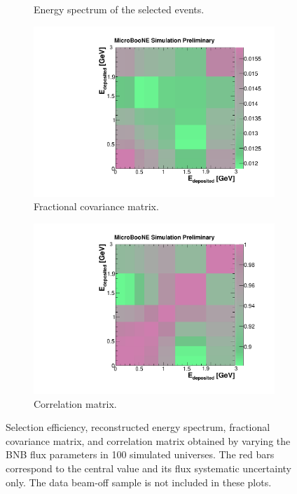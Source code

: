 \begin{figure}[htbp]
\begin{center}
\begin{subfigure}{0.49\textwidth}
      \caption{Energy spectrum of the selected events.}  \label{fig:reco_flux}
    \end{subfigure}
    \begin{subfigure}{0.49\textwidth}
      \includegraphics[width=\linewidth]{figures/frac_flux.pdf}
      \caption{Fractional covariance matrix.}  \label{fig:frac_flux}
    \end{subfigure}\hfill
    \begin{subfigure}{0.49\textwidth}
      \includegraphics[width=\linewidth]{figures/corr_flux.pdf}
      \caption{Correlation matrix.}  \label{fig:corr_flux}
    \end{subfigure}
    \caption{Selection efficiency, reconstructed energy spectrum, fractional covariance matrix, and correlation matrix obtained by varying the BNB flux parameters in 100 simulated universes. The red bars correspond to the central value and its flux systematic uncertainty only. The data beam-off sample is not included in these plots.}\label{fig:flux_sys}
	\end{center}
\end{figure}

